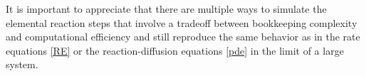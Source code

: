 \documentclass[11pt]{iopart}
\begin{document}
It is important to appreciate that there are multiple ways to simulate the
elemental reaction steps that involve a tradeoff between bookkeeping
complexity and computational efficiency and still reproduce the same behavior
as in the rate equations \eqref{RE} or the reaction-diffusion equations
\eqref{pde} in the limit of a large system.
\end{document}

